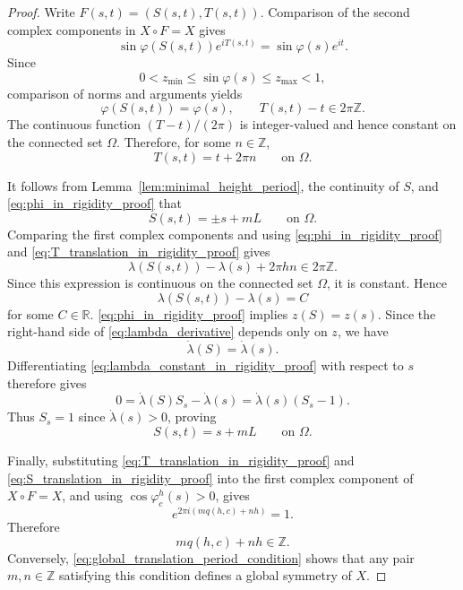 \documentclass[a4paper,11pt]{amsart}
\numberwithin{equation}{section}
\theoremstyle{plain}
\begin{document}
\begin{proof}
Write $F(s,t)=(S(s,t),T(s,t))$. Comparison of the second complex components in $X\circ F=X$ gives
\[
\sin\varphi(S(s,t))e^{iT(s,t)}
=
\sin\varphi(s)e^{it}.
\]
Since
\[
0<z_{\min}\leq \sin\varphi(s)\leq z_{\max}<1,
\]
comparison of norms and arguments yields
\begin{equation}\label{eq:phi_in_rigidity_proof}
\varphi(S(s,t))=\varphi(s),
\qquad
T(s,t)-t\in2\pi\mathbb Z.
\end{equation}
The continuous function $(T-t)/(2\pi)$ is integer-valued and hence
constant on the connected set $\Omega$. Therefore, for some
$n\in\mathbb Z$,
\begin{equation}\label{eq:T_translation_in_rigidity_proof}
T(s,t)=t+2\pi n
\qquad\text{on }\Omega.
\end{equation}

It follows from Lemma~\ref{lem:minimal_height_period}, the continuity of $S$, and \eqref{eq:phi_in_rigidity_proof} that
\[
S(s,t)=\pm s+mL
\qquad\text{on }\Omega.
\]
Comparing the first complex components and using
\eqref{eq:phi_in_rigidity_proof} and
\eqref{eq:T_translation_in_rigidity_proof} gives
\[
\lambda(S(s,t))-\lambda(s)+2\pi hn\in2\pi\mathbb Z.
\]
Since this expression is continuous on the connected set $\Omega$, it
is constant. Hence
\begin{equation}\label{eq:lambda_constant_in_rigidity_proof}
\lambda(S(s,t))-\lambda(s)=C
\end{equation}
for some $C\in\mathbb R$.
 \eqref{eq:phi_in_rigidity_proof} implies $z(S)=z(s)$. Since
the right-hand side of \eqref{eq:lambda_derivative} depends only on
$z$, we have
\[
\dot\lambda(S)=\dot\lambda(s).
\]
Differentiating \eqref{eq:lambda_constant_in_rigidity_proof} with
respect to $s$ therefore gives
\[
0
=
\dot\lambda(S)S_s-\dot\lambda(s)
=
\dot\lambda(s)(S_s-1).
\]
Thus $S_s=1$ since $\dot\lambda(s)>0$, proving 
\begin{equation}\label{eq:S_translation_in_rigidity_proof}
S(s,t)=s+mL
\qquad\text{on }\Omega.
\end{equation}

Finally, substituting \eqref{eq:T_translation_in_rigidity_proof} and
\eqref{eq:S_translation_in_rigidity_proof} into the first complex
component of $X\circ F=X$, and using $\cos\varphi_c^h(s)>0$, gives
\[
e^{2\pi i(mq(h,c)+nh)}=1.
\]
Therefore
\[
mq(h,c)+nh\in\mathbb Z.
\]
Conversely, \eqref{eq:global_translation_period_condition} shows that
any pair $m,n\in\mathbb Z$ satisfying this condition defines a global
symmetry of $X$.
\end{proof}
\end{document}
